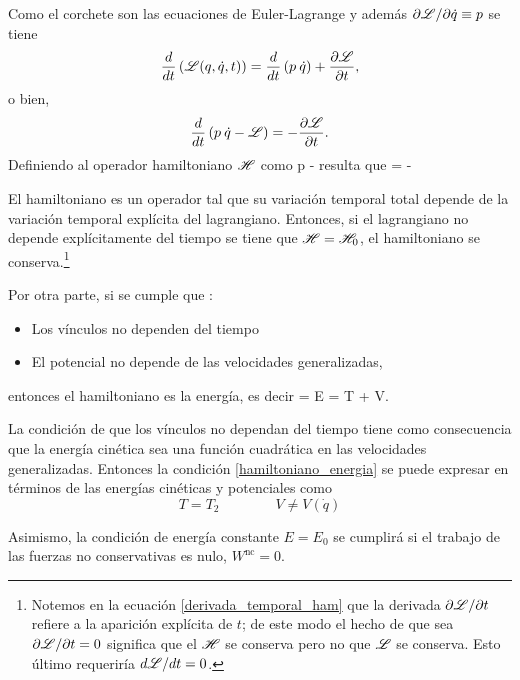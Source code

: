 \documentclass[10pt,oneside]{CBFT_book}
\begin{document}
Como el corchete son las ecuaciones de Euler-Lagrange y además $\partial\mathscr{L}/\partial \dot{q} \equiv p$ se tiene
\[
	\frac{d}{dt}\left( \mathscr{L}( q, \dot{q}, t)\right) = \frac{d}{dt}\left( p \: \dot{q} \right) + \frac{\partial^{\hspace{-0.05em}} {\mathscr{L}}}{\partial {t}^{\hspace{-0.05em}}},
\]
o bien,
\[
	\frac{d}{dt}\left( p \: \dot{q} - \mathscr{L} \right) = -\frac{\partial^{\hspace{-0.05em}} {\mathscr{L}}}{\partial {t}^{\hspace{-0.05em}}}.
\]
Definiendo al operador hamiltoniano $\mathscr{H}$ como 
\be
	\Ham \equiv p\: - \Lag 
	\label{hamiltoniano}
\ee
resulta que 
\be
	 = - 
	\label{derivada_temporal_ham}
\ee

El hamiltoniano es un operador tal que su variación temporal total depende de la variación temporal explícita del 
lagrangiano.
Entonces, si el lagrangiano no depende explícitamente del tiempo se tiene que $ \mathscr{H} = \mathscr{H}_0 $, el hamiltoniano
se conserva.\footnote{Notemos en la ecuación \eqref{derivada_temporal_ham} que la derivada $ \partial \mathscr{L} / \partial t$ 
refiere a la aparición explícita de $ t $; de este modo el hecho de que sea $ \partial \mathscr{L} / \partial t = 0 $ significa
que el $\mathscr{H}$ se conserva pero no que $\mathscr{L}$ se conserva. Esto último requeriría $ d \mathscr{L} / dt = 0 $.}


Por otra parte, si se cumple que :
\begin{itemize}
 \item Los vínculos no dependen del tiempo
 \item El potencial no depende de las velocidades generalizadas,
\end{itemize}
entonces el hamiltoniano es la energía, es decir 
\be
	\Ham = E = T + V.
	\label{hamiltoniano_energia}
\ee

La condición de que los vínculos no dependan del tiempo tiene como consecuencia que la energía cinética sea una 
función cuadrática en las velocidades generalizadas. Entonces la condición \eqref{hamiltoniano_energia} se puede
expresar en términos de las energías cinéticas y potenciales como 
\[
	T = T_2   \qquad   \qquad   V \neq V(\dot{q})
\]

Asimismo, la condición de energía constante $ E = E_0 $ se cumplirá si el trabajo de las fuerzas no conservativas
es nulo, $ W^{\text{nc}} = 0 $.
\end{document}
